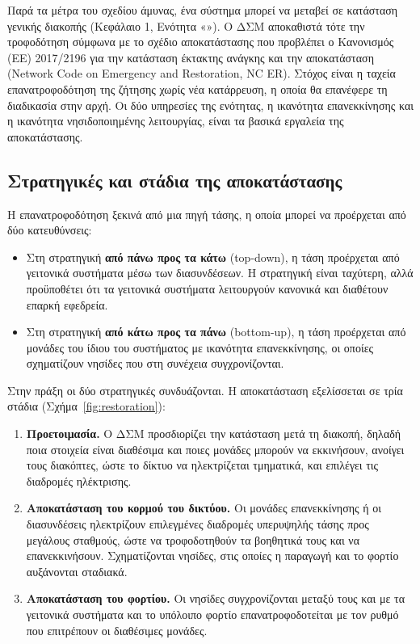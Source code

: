 Παρά τα μέτρα του σχεδίου άμυνας, ένα σύστημα μπορεί να μεταβεί σε κατάσταση γενικής διακοπής
(Κεφάλαιο 1, Ενότητα «»). Ο ΔΣΜ αποκαθιστά τότε την τροφοδότηση σύμφωνα με
το σχέδιο αποκατάστασης που προβλέπει ο Κανονισμός (ΕΕ) 2017/2196 για την κατάσταση έκτακτης
ανάγκης και την αποκατάσταση (Network Code on Emergency and Restoration, NC ER). Στόχος είναι η
ταχεία επανατροφοδότηση της ζήτησης χωρίς νέα κατάρρευση, η οποία θα επανέφερε τη διαδικασία
στην αρχή. Οι δύο υπηρεσίες της ενότητας, η ικανότητα επανεκκίνησης και η ικανότητα
νησιδοποιημένης λειτουργίας, είναι τα βασικά εργαλεία της αποκατάστασης.

\subsection{Στρατηγικές και στάδια της αποκατάστασης}
\label{sec:restoration-stages}

Η επανατροφοδότηση ξεκινά από μια πηγή τάσης, η οποία μπορεί να προέρχεται από δύο κατευθύνσεις:

\begin{itemize}
\item Στη στρατηγική \textbf{από πάνω προς τα κάτω} (top-down), η τάση προέρχεται από γειτονικά
      συστήματα μέσω των διασυνδέσεων. Η στρατηγική είναι ταχύτερη, αλλά προϋποθέτει ότι τα
      γειτονικά συστήματα λειτουργούν κανονικά και διαθέτουν επαρκή εφεδρεία.
\item Στη στρατηγική \textbf{από κάτω προς τα πάνω} (bottom-up), η τάση προέρχεται από μονάδες
      του ίδιου του συστήματος με ικανότητα επανεκκίνησης, οι οποίες σχηματίζουν νησίδες που
      στη συνέχεια συγχρονίζονται.
\end{itemize}

Στην πράξη οι δύο στρατηγικές συνδυάζονται. Η αποκατάσταση εξελίσσεται σε τρία στάδια
(Σχήμα~\ref{fig:restoration}):

\begin{enumerate}
\item \textbf{Προετοιμασία.} Ο ΔΣΜ προσδιορίζει την κατάσταση μετά τη διακοπή, δηλαδή ποια
      στοιχεία είναι διαθέσιμα και ποιες μονάδες μπορούν να εκκινήσουν, ανοίγει τους
      διακόπτες, ώστε το δίκτυο να ηλεκτρίζεται τμηματικά, και επιλέγει τις διαδρομές
      ηλέκτρισης.
\item \textbf{Αποκατάσταση του κορμού του δικτύου.} Οι μονάδες επανεκκίνησης ή οι διασυνδέσεις
      ηλεκτρίζουν επιλεγμένες διαδρομές υπερυψηλής τάσης προς μεγάλους σταθμούς, ώστε να
      τροφοδοτηθούν τα βοηθητικά τους και να επανεκκινήσουν. Σχηματίζονται νησίδες, στις οποίες
      η παραγωγή και το φορτίο αυξάνονται σταδιακά.
\item \textbf{Αποκατάσταση του φορτίου.} Οι νησίδες συγχρονίζονται μεταξύ τους και με τα
      γειτονικά συστήματα και το υπόλοιπο φορτίο επανατροφοδοτείται με τον ρυθμό που
      επιτρέπουν οι διαθέσιμες μονάδες.
\end{enumerate}

